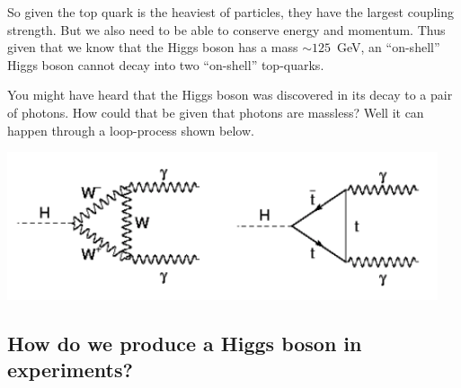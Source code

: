 So given the top quark is the heaviest of particles, they have the largest coupling strength. But we also need to be able to conserve energy and momentum. Thus given that we know that the Higgs boson has a mass $\sim125$~GeV, an ``on-shell'' Higgs boson cannot decay into two ``on-shell'' top-quarks. 

You might have heard that the Higgs boson was discovered in its decay to a pair of photons. How could that be given that photons are massless? Well it can happen through a loop-process shown below.
\begin{center}
\includegraphics[width=0.95\textwidth]{fig/higgs/higgs_decay_photons.png}
\end{center}

\subsection{How do we produce a Higgs boson in experiments?}
